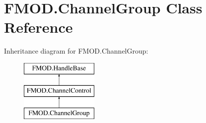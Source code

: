 \hypertarget{class_f_m_o_d_1_1_channel_group}{}\section{F\+M\+O\+D.\+Channel\+Group Class Reference}
\label{class_f_m_o_d_1_1_channel_group}
Inheritance diagram for F\+M\+O\+D.\+Channel\+Group\+:\begin{figure}[H]
\begin{center}
\leavevmode
\includegraphics[height=3.000000cm]{class_f_m_o_d_1_1_channel_group}
\end{center}
\end{figure}
